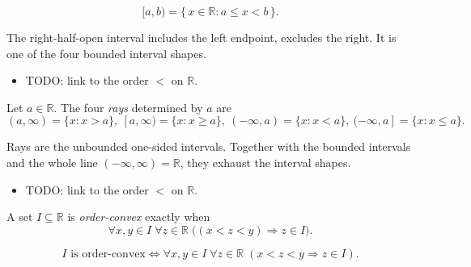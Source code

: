 \begin{remark*}
\[
[a,b)=\{\,x\in\mathbb{R} : a\le x<b\,\}.
\]
\end{remark*}
\begin{remark*}[Interpretation]
The right-half-open interval includes the left endpoint, excludes the right. It is one of the four bounded interval shapes.
\end{remark*}
\begin{dependencies}
\begin{itemize}
  \item TODO: link to the order $<$ on $\mathbb{R}$.
\end{itemize}
\end{dependencies}
\begin{tcolorbox}[colback=defbox, colframe=defborder, arc=2pt,
  left=6pt, right=6pt, top=4pt, bottom=4pt,
  title={\small\textbf{Definition (Ray)}},
  fonttitle=\small\bfseries]
\begin{definition}[Ray]
\label{def:ray}
Let $a\in\mathbb{R}$. The four \emph{rays} determined by $a$ are
\[
(a,\infty)=\{x:x>a\},\ [a,\infty)=\{x:x\ge a\},\ (-\infty,a)=\{x:x<a\},\ (-\infty,a]=\{x:x\le a\}.
\]
\end{definition}
\end{tcolorbox}
\begin{remark*}[Interpretation]
Rays are the unbounded one-sided intervals. Together with the bounded intervals and the whole line $(-\infty,\infty)=\mathbb{R}$, they exhaust the interval shapes.
\end{remark*}
\begin{dependencies}
\begin{itemize}
  \item TODO: link to the order $<$ on $\mathbb{R}$.
\end{itemize}
\end{dependencies}
\begin{tcolorbox}[colback=defbox, colframe=defborder, arc=2pt,
  left=6pt, right=6pt, top=4pt, bottom=4pt,
  title={\small\textbf{Definition (Order-Convex Set)}},
  fonttitle=\small\bfseries]
\begin{definition}
\label{def:order-convex-set}
A set $I\subseteq\mathbb{R}$ is \emph{order-convex} exactly when
\[
\forall x,y\in I\;\forall z\in\mathbb{R}\;\bigl((x<z<y)\Longrightarrow z\in I\bigr).
\]
\end{definition}
\end{tcolorbox}
\begin{remark*}
\[
I \text{ is order-convex} \Longleftrightarrow \forall x,y\in I\;\forall z\in\mathbb{R}\;(x<z<y\Rightarrow z\in I).
\]
\end{remark*}
